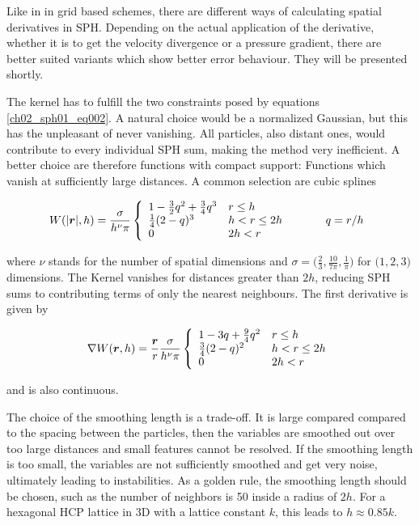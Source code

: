 Like in in grid based schemes, there are different ways of calculating spatial derivatives in SPH.
Depending on the actual application of the derivative, whether it is to get the velocity divergence or a pressure gradient, there are better suited variants which show better error behaviour. They will be presented shortly.

The kernel has to fulfill the two constraints posed by equations \ref{ch02_sph01_eq002}. A natural choice would be a normalized Gaussian, but this has the unpleasant of never vanishing. All particles, also distant ones, would contribute to every individual SPH sum, making the method very inefficient. A better choice are therefore functions with compact support: Functions which vanish at sufficiently large distances. A common selection are cubic splines

\begin{equation}
\label{ch02_sph01_eq007}
W(| \boldsymbol{r} |, h) = \frac{\sigma}{h^\nu \pi} \left \{ \begin{array}{lll}
1 - \frac{3}{2}q^2 + \frac{3}{4}q^3 & r \leq h & \\
\frac{1}{4}(2-q)^3 & h < r  \leq 2h & \hspace{1.0cm} q = r / h\\
0 & 2h < r & \\
\end{array} \right. 
\end{equation}

where $\nu$ stands for the number of spatial dimensions and $\sigma = \big( \frac{2}{3}, \frac{10}{7\pi}, \frac{1}{\pi} \big) $ for $\big( 1,2,3\big)$ dimensions. The Kernel vanishes for distances greater than $2h$, reducing SPH sums to contributing terms of only the nearest neighbours. The first derivative is given by 

\begin{equation}
\label{ch02_sph01_eq008}
\nabla W(\boldsymbol{r}, h) = \frac{\boldsymbol{r}}{r} \frac{\sigma}{h^\nu \pi} \left \{ \begin{array}{ll}
1 - 3q + \frac{9}{4}q^2 & r \leq h \\
\frac{3}{4}(2-q)^2 & h < r  \leq 2h \\
0 & 2h < r \\
\end{array} \right. 
\end{equation}

and is also continuous. 

The choice of the smoothing length is a trade-off. It is large compared compared to the spacing between the particles, then the variables are smoothed out over too large distances and small features cannot be resolved. If the smoothing length is too small, the variables are not sufficiently smoothed and get very noise, ultimately leading to instabilities. As a golden rule, the smoothing length should be chosen, such as the number of neighbors is 50 inside a radius of $2h$. For a hexagonal HCP lattice in 3D with a lattice constant $k$, this leads to $h \approx 0.85 k$. 

